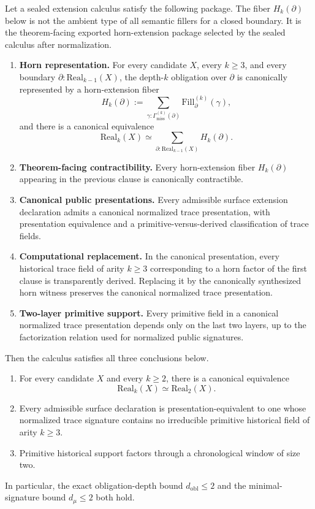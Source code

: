 \begin{theorem}
\label{thm:abstract-horn-computational-interface}
Let a sealed extension calculus satisfy the following package.  The fiber \(H_k(\partial)\)
below is not the ambient type of all semantic fillers for a closed boundary.  It is the
theorem-facing exported horn-extension package selected by the sealed calculus after
normalization.

\begin{enumerate}
\item \textbf{Horn representation.}  For every candidate \(X\), every \(k\geq 3\), and every
boundary \(\partial : \mathrm{Real}_{k-1}(X)\), the depth-\(k\) obligation over \(\partial\) is
canonically represented by a horn-extension fiber
\[
  H_k(\partial)
  :=
  \sum_{\gamma:\Gamma^{(k)}_{\mathrm{miss}}(\partial)}
  \mathrm{Fill}^{(k)}_{\partial}(\gamma),
\]
and there is a canonical equivalence
\[
  \mathrm{Real}_k(X)
  \simeq
  \sum_{\partial:\mathrm{Real}_{k-1}(X)} H_k(\partial).
\]

\item \textbf{Theorem-facing contractibility.}  Every horn-extension fiber
\(H_k(\partial)\) appearing in the previous clause is canonically contractible.

\item \textbf{Canonical public presentations.}  Every admissible surface extension
declaration admits a canonical normalized trace presentation, with presentation equivalence
and a primitive-versus-derived classification of trace fields.

\item \textbf{Computational replacement.}  In the canonical presentation, every historical
trace field of arity \(k\geq 3\) corresponding to a horn factor of the first clause is
transparently derived.  Replacing it by the canonically synthesized horn witness preserves the
canonical normalized trace presentation.

\item \textbf{Two-layer primitive support.}  Every primitive field in a canonical normalized
trace presentation depends only on the last two layers, up to the factorization relation used
for normalized public signatures.
\end{enumerate}

Then the calculus satisfies all three conclusions below.
\begin{enumerate}
\item For every candidate \(X\) and every \(k\geq 2\), there is a canonical equivalence
\[
  \mathrm{Real}_k(X) \simeq \mathrm{Real}_2(X).
\]
\item Every admissible surface declaration is presentation-equivalent to one whose normalized
trace signature contains no irreducible primitive historical field of arity \(k\geq 3\).
\item Primitive historical support factors through a chronological window of size two.
\end{enumerate}
In particular, the exact obligation-depth bound \(d_{\mathrm{obl}}\leq 2\) and the
minimal-signature bound \(d_\mu\leq 2\) both hold.
\end{theorem}

